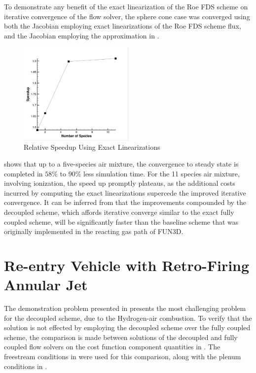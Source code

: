 To demonstrate any benefit of the exact linearization of the Roe FDS scheme on
iterative convergence of the flow solver, the sphere cone case was converged
using both the Jacobian employing exact linearizations of the Roe FDS scheme
flux, and the Jacobian employing the approximation in .
\begin{figure}[h]
  \centering
  \includegraphics[width=0.5\textwidth]{figures/flow-efficiency/exact-approx-speedup.png}
  \caption{Relative Speedup Using Exact Linearizations}
  \label{fig:exact-approx-speedup}
\end{figure}
 shows that up to a five-species air mixture, the
convergence to steady state is completed in $58\%$ to $90\%$ less simulation
time.  For the 11 species air mixture, involving ionization, the speed up
promptly plateaus, as the additional costs incurred by computing the exact
linearizations supercede the improved iterative convergence.  It can be inferred
from  that the improvements compounded by the
decoupled scheme, which affords iterative converge similar to the exact fully
coupled scheme, will be significantly faster than the baseline scheme that was
originally implemented in the reacting gas path of FUN3D.

\section{Re-entry Vehicle with Retro-Firing Annular Jet}

The demonstration problem presented in 
presents the most challenging problem for the decoupled scheme, due to the
Hydrogen-air combustion.  To verify that the solution is not effected by
employing the decoupled scheme over the fully coupled scheme, the comparison is
made between solutions of the decoupled and fully coupled flow solvers on the
cost function component quantities in .  The
freestream conditions in  were used for this
comparison, along with the plenum conditions in .

